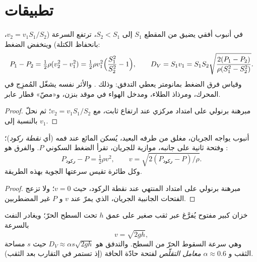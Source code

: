 \section{تطبيقات}

\begin{proposition}\label{prop:b2:euler-bernoulli:venturi}
في أنبوب أفقي يضيق من المقطع $S_1$ إلى $S_2 < S_1$، ترتفع
السرعة ($v_2 = v_1S_1/S_2$، بانحفاظ الكتلة) وينخفض الضغط:
\[
P_1 - P_2 = \tfrac12\rho(v_2^2 - v_1^2) = \tfrac12\rho v_1^2\Bigl(\frac{S_1^2}{S_2^2} - 1\Bigr) ,
\qquad
D_V = S_1v_1 = S_1S_2\sqrt{\frac{2(P_1 - P_2)}{\rho(S_1^2 - S_2^2)}} .
\]
وقياس فرق الضغط بمانومتر يعطي التدفق: وذلك \emph{}.
والأثر نفسه يشغّل المُمزِج في المحرك، ومرذاذ الطلاء، ومدخل
الهواء في موقد بنزن، و«مصّ» قطار عابر.
\end{proposition}

\begin{proof}
مبرهنة برنولي على امتداد  مركزي عند ارتفاع ثابت، مع $v_2 =
v_1S_1/S_2$؛ ثم نحلّ بالنسبة إلى $v_1$.
\end{proof}

\begin{proposition}\label{prop:b2:euler-bernoulli:pitot}
أنبوب يواجه الجريان، مغلق من طرفه البعيد، يُسكن المائع عند
فمه (أي \emph{نقطة ركود})؛ وفتحة ثانية على جانبه، موازية
للجريان، تقرأ الضغط السكوني $P$. والفرق هو :
\[
P_{\text{ركود}} - P = \tfrac12\rho v^2 , \qquad v = \sqrt{2(P_{\text{ركود}} - P)/\rho} .
\]
وكل طائرة تقيس سرعتها الجوية بهذه الطريقة.
\end{proposition}

\begin{proof}
مبرهنة برنولي على امتداد  المنتهي عند نقطة الركود،
حيث $v = 0$؛ ولا تزعج الفتحات الجانبية الجريان، الذي يمرّ عند
$v$ و $P$ غير المضطربين.
\end{proof}

\begin{proposition}\label{prop:b2:euler-bernoulli:torricelli}
خزان كبير مفتوح يُفرَّغ عبر ثقب صغير على عمق $h$ تحت السطح
الحرّ؛ ويغادر النفث بالسرعة
\[
v = \sqrt{2gh} ,
\]
وهي سرعة السقوط الحرّ من السطح. والتدفق هو $D_V \approx
\alpha s\sqrt{2gh}$ حيث $s$ مساحة الثقب و $\alpha \approx 0.6$
\emph{معامل التقلّص} لفتحة حادّة الحافة (إذ تستمر 
في التقارب بعد الثقب).
\end{proposition}

